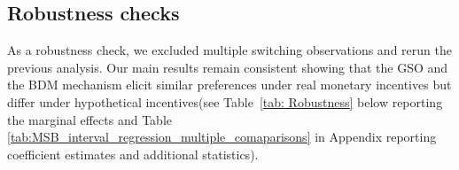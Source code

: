 \documentclass[12pt]{article}
\begin{document}

\subsection{Robustness checks}

As a robustness check, we excluded multiple switching observations and rerun the previous analysis.
Our main results remain consistent showing that the GSO and the BDM mechanism elicit similar preferences under real monetary incentives but differ under hypothetical incentives(see Table~\ref{tab: Robustness} below reporting the marginal effects and Table \ref{tab:MSB_interval_regression_multiple_comaparisons} in Appendix reporting coefficient estimates and additional statistics). 
 
\end{document}
